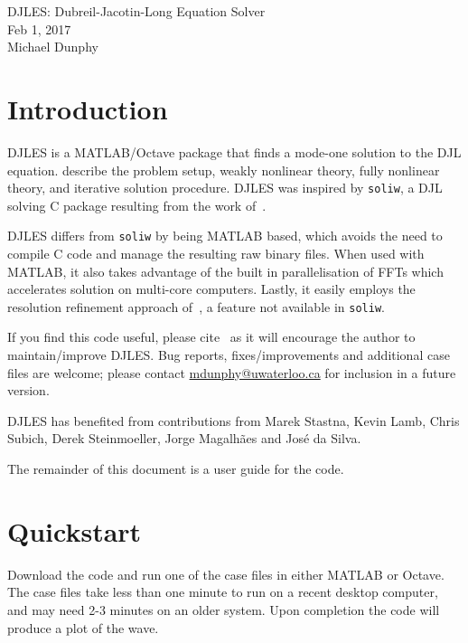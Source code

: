 \documentclass[letterpaper]{article}
\begin{document}
\newpage
\pagestyle{plain}
\setcounter{page}{1}

\begin{center}
\huge{DJLES: Dubreil-Jacotin-Long Equation Solver}\\[1em]
\large{Feb 1, 2017}\\
Michael Dunphy
\end{center}

\section{Introduction}
DJLES is a MATLAB/Octave package that finds a mode-one solution to the DJL equation. \cite{StastnaLamb2002} describe the problem setup, weakly nonlinear theory, fully nonlinear theory, and iterative solution procedure. DJLES was inspired by \verb+soliw+, a DJL solving C package resulting from the work of~\cite{StastnaLamb2002}.

DJLES differs from \verb+soliw+ by being MATLAB based, which avoids the need to compile C code and manage the resulting raw binary files. When used with MATLAB, it also takes advantage of the built in parallelisation of FFTs which accelerates solution on multi-core computers. Lastly, it easily employs the resolution refinement approach of~\cite{DunphySubichStastna2011}, a feature not available in \verb+soliw+.

If you find this code useful, please cite~\cite{DunphySubichStastna2011} as it will encourage the author to maintain/improve DJLES. Bug reports, fixes/improvements and additional case files are welcome; please contact \href{mailto:mdunphy@uwaterloo.ca}{mdunphy@uwaterloo.ca} for inclusion in a future version.

DJLES has benefited from contributions from Marek Stastna, Kevin Lamb, Chris Subich, Derek Steinmoeller, Jorge Magalh\~aes and Jos\'e da Silva.

The remainder of this document is a user guide for the code.

\section{Quickstart}
Download the code and run one of the case files in either MATLAB or Octave. The case files take less than one minute to run on a recent desktop computer, and may need 2-3 minutes on an older system. Upon completion the code will produce a plot of the wave.
\end{document}

